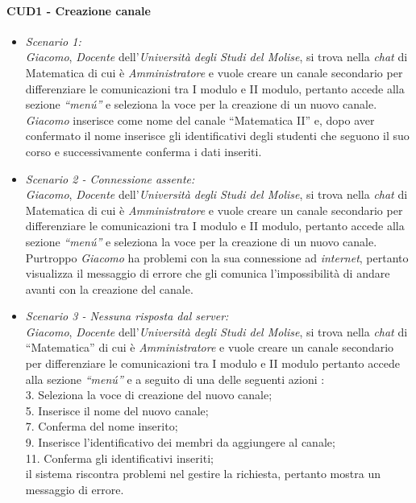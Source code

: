 \paragraph{CUD1 - Creazione canale\\}
\begin{itemize}
	\item \textit{Scenario 1:\\}
	\textit{Giacomo}, \textit{Docente} dell’\textit{Università degli Studi del Molise}, si trova nella \textit{chat} di Matematica di cui è \textit{Amministratore} e vuole creare un canale secondario per differenziare le comunicazioni tra I modulo e II modulo, pertanto  accede alla sezione \textit{“menú”} e seleziona la voce per la creazione di un nuovo canale. \textit{Giacomo} inserisce come nome del canale  “Matematica II” e, dopo aver confermato il nome inserisce gli identificativi degli  studenti che seguono il suo corso e successivamente conferma i dati inseriti.\\
	
	\item \textit{Scenario 2 - Connessione assente:\\}
	\textit{Giacomo}, \textit{Docente} dell’\textit{Università degli Studi del Molise}, si trova nella \textit{chat} di Matematica di cui è \textit{Amministratore} e vuole creare un canale secondario per differenziare le comunicazioni tra I modulo e II modulo,  pertanto  accede alla sezione \textit{“menú”} e seleziona la voce per la creazione di un nuovo canale. Purtroppo \textit{Giacomo} ha problemi con la sua connessione ad \textit{internet}, pertanto visualizza il messaggio di errore che gli comunica l’impossibilità di andare avanti con la creazione del canale.\\
	
	\item \textit{Scenario 3 - Nessuna risposta dal server:\\}
	\textit{Giacomo}, \textit{Docente} dell’\textit{Università degli Studi del Molise}, si trova nella \textit{chat} di “Matematica” di cui è \textit{Amministratore} e vuole creare un canale secondario per differenziare le comunicazioni tra I modulo e II modulo pertanto accede alla sezione \textit{“menú”} e a seguito di una delle seguenti azioni :\\
	3. Seleziona la voce di creazione del nuovo canale;\\
	5. Inserisce il nome del nuovo canale;\\
	7. Conferma del nome inserito;\\
	9. Inserisce l’identificativo dei membri da aggiungere al canale;\\
	11. Conferma gli identificativi inseriti;\\
	il sistema riscontra problemi nel gestire la richiesta, pertanto mostra un messaggio di errore.\\
\end{itemize}

